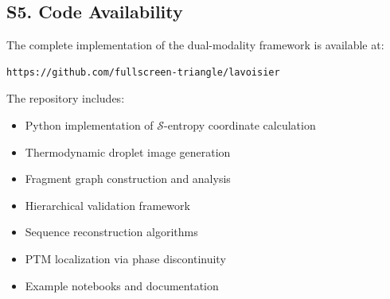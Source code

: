 \documentclass[11pt,twocolumn]{article}
\newcommand{\sentropy}{$\mathcal{S}$-entropy}
\begin{document}
\subsection*{S5. Code Availability}

The complete implementation of the dual-modality framework is available at:

\begin{verbatim}
https://github.com/fullscreen-triangle/lavoisier
\end{verbatim}

The repository includes:
\begin{itemize}
    \item Python implementation of \sentropy{} coordinate calculation
    \item Thermodynamic droplet image generation
    \item Fragment graph construction and analysis
    \item Hierarchical validation framework
    \item Sequence reconstruction algorithms
    \item PTM localization via phase discontinuity
    \item Example notebooks and documentation
\end{itemize}
\end{document}
